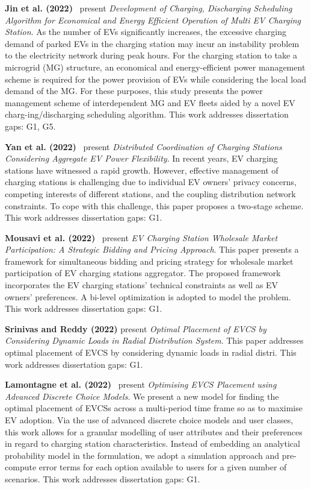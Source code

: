 \documentclass[letterpaper, 12pt, oneside, doublespacing]{Thesis}
\begin{document}
\noindent \textbf{Jin et al. (2022)}~\cite{development_of_2022} present \textit{Development of Charging, Discharging Scheduling Algorithm for Economical and Energy Efficient Operation of Multi EV Charging Station}. As the number of EVs significantly increases, the excessive charging demand of parked EVs in the charging station may incur an instability problem to the electricity network during peak hours. For the charging station to take a microgrid (MG) structure, an economical and energy-efficient power management scheme is required for the power provision of EVs while considering the local load demand of the MG. For these purposes, this study presents the power management scheme of interdependent MG and EV fleets aided by a novel EV charg-ing/discharging scheduling algorithm. This work addresses dissertation gaps: G1, G5.



\noindent \textbf{Yan et al. (2022)}~\cite{distributed_coordination_2022} present \textit{Distributed Coordination of Charging Stations Considering Aggregate EV Power Flexibility}. In recent years, EV charging stations have witnessed a rapid growth. However, effective management of charging stations is challenging due to individual EV owners' privacy concerns, competing interests of different stations, and the coupling distribution network constraints. To cope with this challenge, this paper proposes a two-stage scheme. This work addresses dissertation gaps: G1.



\noindent \textbf{Mousavi et al. (2022)}~\cite{ev_charging_2022} present \textit{EV Charging Station Wholesale Market Participation: A Strategic Bidding and Pricing Approach}. This paper presents a framework for simultaneous bidding and pricing strategy for wholesale market participation of EV charging stations aggregator. The proposed framework incorporates the EV charging stations' technical constraints as well as EV owners' preferences. A bi-level optimization is adopted to model the problem. This work addresses dissertation gaps: G1.



\noindent \textbf{Srinivas and Reddy (2022)} present \textit{Optimal Placement of EVCS by Considering Dynamic Loads in Radial Distribution System}. This paper addresses optimal placement of EVCS by considering dynamic loads in radial distri. This work addresses dissertation gaps: G1.



\noindent \textbf{Lamontagne et al. (2022)}~\cite{optimising_electric_2022} present \textit{Optimising EVCS Placement using Advanced Discrete Choice Models}. We present a new model for finding the optimal placement of EVCSs across a multi-period time frame so as to maximise EV adoption. Via the use of advanced discrete choice models and user classes, this work allows for a granular modelling of user attributes and their preferences in regard to charging station characteristics. Instead of embedding an analytical probability model in the formulation, we adopt a simulation approach and pre-compute error terms for each option available to users for a given number of scenarios. This work addresses dissertation gaps: G1.
\end{document}
